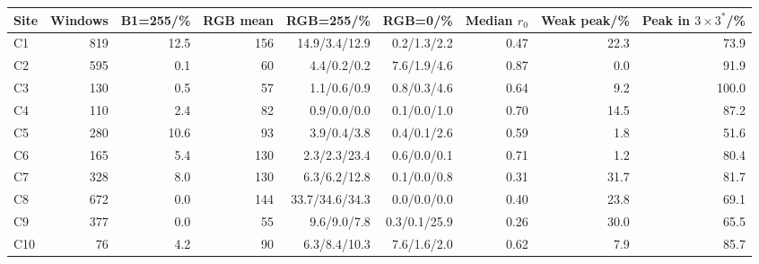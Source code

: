 \begin{tabular}{@{}lrrrrrrrr@{}}
\toprule
Site & Windows & B1=255/\% & RGB mean & RGB=255/\% & RGB=0/\% & Median $r_0$ & Weak peak/\% & Peak in $3\times 3^{*}$/\%\\
\midrule
C1 & 819 & 12.5 & 156 & 14.9/3.4/12.9 & 0.2/1.3/2.2 & 0.47 & 22.3 & 73.9 \\
C2 & 595 & 0.1 & 60 & 4.4/0.2/0.2 & 7.6/1.9/4.6 & 0.87 & 0.0 & 91.9 \\
C3 & 130 & 0.5 & 57 & 1.1/0.6/0.9 & 0.8/0.3/4.6 & 0.64 & 9.2 & 100.0 \\
C4 & 110 & 2.4 & 82 & 0.9/0.0/0.0 & 0.1/0.0/1.0 & 0.70 & 14.5 & 87.2 \\
C5 & 280 & 10.6 & 93 & 3.9/0.4/3.8 & 0.4/0.1/2.6 & 0.59 & 1.8 & 51.6 \\
C6 & 165 & 5.4 & 130 & 2.3/2.3/23.4 & 0.6/0.0/0.1 & 0.71 & 1.2 & 80.4 \\
C7 & 328 & 8.0 & 130 & 6.3/6.2/12.8 & 0.1/0.0/0.8 & 0.31 & 31.7 & 81.7 \\
C8 & 672 & 0.0 & 144 & 33.7/34.6/34.3 & 0.0/0.0/0.0 & 0.40 & 23.8 & 69.1 \\
C9 & 377 & 0.0 & 55 & 9.6/9.0/7.8 & 0.3/0.1/25.9 & 0.26 & 30.0 & 65.5 \\
C10 & 76 & 4.2 & 90 & 6.3/8.4/10.3 & 7.6/1.6/2.0 & 0.62 & 7.9 & 85.7 \\
\bottomrule
\end{tabular}
